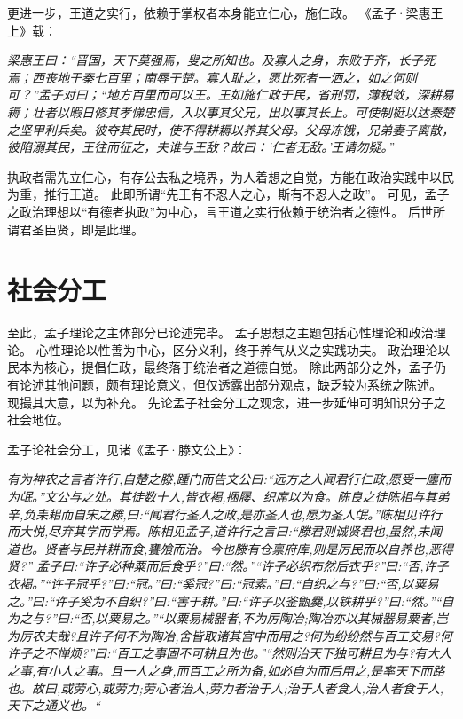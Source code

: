\documentclass[11pt]{article}
\begin{document}
更进一步，王道之实行，依赖于掌权者本身能立仁心，施仁政。
《孟子·梁惠王上》载：

\textit{梁惠王曰：“晋国，天下莫强焉，叟之所知也。及寡人之身，东败于齐，长子死焉；西丧地于秦七百里；南辱于楚。寡人耻之，愿比死者一洒之，如之何则可？”孟子对曰；“地方百里而可以王。王如施仁政于民，省刑罚，薄税敛，深耕易耨；壮者以暇日修其孝悌忠信，入以事其父兄，出以事其长上。可使制梃以达秦楚之坚甲利兵矣。彼夺其民时，使不得耕耨以养其父母。父母冻饿，兄弟妻子离散，彼陷溺其民，王往而征之，夫谁与王敌？故曰：‘仁者无敌。’王请勿疑。”}

执政者需先立仁心，有存公去私之境界，为人着想之自觉，方能在政治实践中以民为重，推行王道。
此即所谓“先王有不忍人之心，斯有不忍人之政”。
可见，孟子之政治理想以“有德者执政”为中心，言王道之实行依赖于统治者之德性。
后世所谓君圣臣贤，即是此理。
  
\section{社会分工}
至此，孟子理论之主体部分已论述完毕。
孟子思想之主题包括心性理论和政治理论。
心性理论以性善为中心，区分义利，终于养气从义之实践功夫。
政治理论以民本为核心，提倡仁政，最终落于统治者之道德自觉。
除此两部分之外，孟子仍有论述其他问题，颇有理论意义，但仅透露出部分观点，缺乏较为系统之陈述。
现撮其大意，以为补充。
先论孟子社会分工之观念，进一步延伸可明知识分子之社会地位。

\par

孟子论社会分工，见诸《孟子·滕文公上》：

\textit{有为神农之言者许行,自楚之滕,踵门而告文公曰:“远方之人闻君行仁政,愿受一廛而为氓。”文公与之处。其徒数十人,皆衣褐,捆屦、织席以为食。陈良之徒陈相与其弟辛,负耒耜而自宋之滕,曰:“闻君行圣人之政,是亦圣人也,愿为圣人氓。”陈相见许行而大悦,尽弃其学而学焉。陈相见孟子,道许行之言曰:“滕君则诚贤君也,虽然,未闻道也。贤者与民并耕而食,饔飧而治。今也滕有仓禀府库,则是厉民而以自养也,恶得贤?”
孟子曰:“许子必种粟而后食乎?”曰:“然。”“许子必织布然后衣乎?”曰:“否,许子衣褐。”“许子冠乎?”曰:“冠。”曰:“奚冠?”曰:“冠素。”曰:“自织之与?”曰:“否,以粟易之。”曰:“许子奚为不自织?”曰:“害于耕。”曰:“许子以釜甑爨,以铁耕乎?”曰:“然。”“自为之与?”曰:“否,以粟易之。”“以粟易械器者,不为厉陶冶;陶冶亦以其械器易粟者,岂为厉农夫哉?且许子何不为陶冶,舍皆取诸其宫中而用之?何为纷纷然与百工交易?何许子之不惮烦?”曰:“百工之事固不可耕且为也。”“然则治天下独可耕且为与?有大人之事,有小人之事。且一人之身,而百工之所为备,如必自为而后用之,是率天下而路也。故曰,或劳心,或劳力;劳心者治人,劳力者治于人;治于人者食人,治人者食于人,天下之通义也。“}
\end{document}
